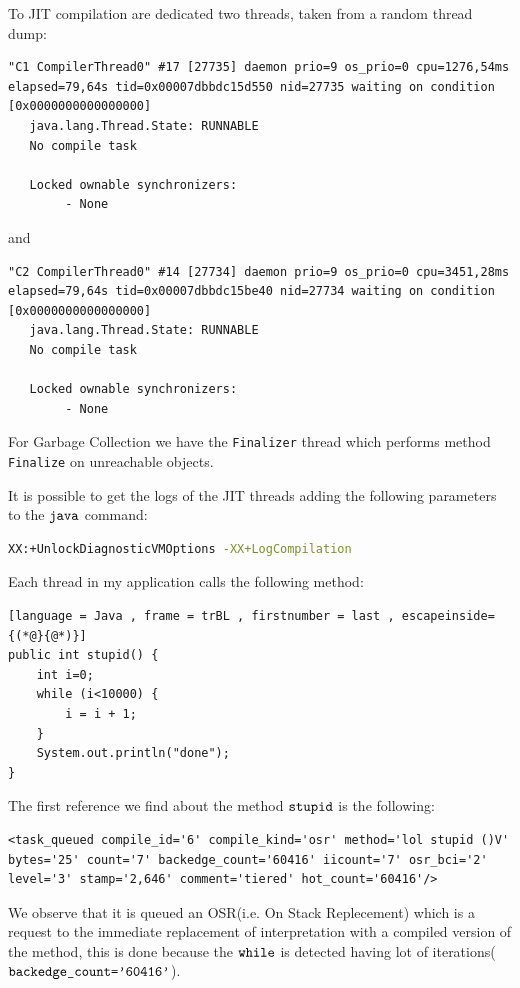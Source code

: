 \documentclass[11pt]{article}
\begin{document}
\begin{question}

To JIT compilation are dedicated two threads, taken from a random thread dump:
\begin{lstlisting}
"C1 CompilerThread0" #17 [27735] daemon prio=9 os_prio=0 cpu=1276,54ms elapsed=79,64s tid=0x00007dbbdc15d550 nid=27735 waiting on condition  [0x0000000000000000]
   java.lang.Thread.State: RUNNABLE
   No compile task

   Locked ownable synchronizers:
        - None

\end{lstlisting}

and 

\begin{lstlisting}
"C2 CompilerThread0" #14 [27734] daemon prio=9 os_prio=0 cpu=3451,28ms elapsed=79,64s tid=0x00007dbbdc15be40 nid=27734 waiting on condition  [0x0000000000000000]
   java.lang.Thread.State: RUNNABLE
   No compile task

   Locked ownable synchronizers:
        - None

\end{lstlisting}

For Garbage Collection we have the \verb|Finalizer| thread which performs method \verb|Finalize| on unreachable objects.

It is possible to get the logs of the JIT threads adding the following parameters to the $\verb|java|$ command:

\begin{lstlisting}[language=bash, caption={Parameters for logging JIT Threads activities}]
XX:+UnlockDiagnosticVMOptions -XX+LogCompilation
\end{lstlisting}
\newpage
Each thread in my application calls the following method:
\begin{lstlisting}[language = Java , frame = trBL , firstnumber = last , escapeinside={(*@}{@*)}]
public int stupid() {
    int i=0;
    while (i<10000) {
        i = i + 1;
    }
    System.out.println("done");
}
\end{lstlisting}

The first reference we find about the method $\verb|stupid|$ is the following:
\begin{lstlisting}
<task_queued compile_id='6' compile_kind='osr' method='lol stupid ()V' bytes='25' count='7' backedge_count='60416' iicount='7' osr_bci='2' level='3' stamp='2,646' comment='tiered' hot_count='60416'/>
\end{lstlisting}

We observe that it is queued an OSR(i.e. On Stack Replecement) which is a request to the immediate replacement of interpretation with a compiled version of the method, this is done because the $\verb|while|$ is detected having lot of iterations($\verb|backedge_count='60416'|$).

\end{question}
\end{document}
